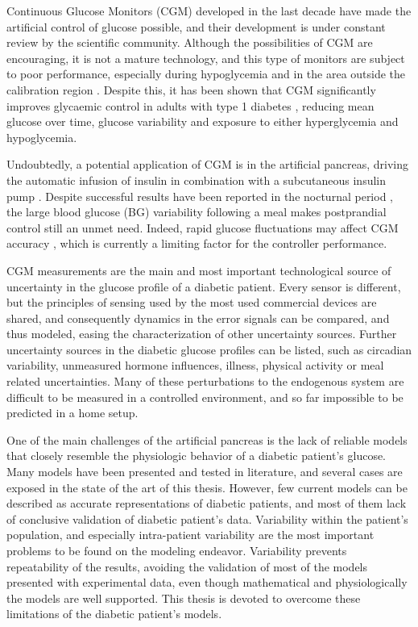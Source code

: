 Continuous Glucose Monitors (CGM) developed in the last decade have made the artificial control of glucose possible, and their development is under constant review by the scientific community. Although the possibilities of CGM are encouraging, it is not a mature technology, and this type of monitors are subject to poor performance, especially during hypoglycemia and in the area outside the calibration region \cite{mazze2009evaluating}. Despite this, it has been shown that CGM significantly improves glycaemic control in adults with type 1 diabetes \cite{bailey2007reduction} \cite{garg2007continuous}, reducing mean glucose over time, glucose variability and exposure to either hyperglycemia and hypoglycemia. %

Undoubtedly, a potential application of CGM is in the artificial pancreas, driving the automatic infusion of insulin in combination with a subcutaneous insulin pump \cite{hirsch2008clinical}. Despite successful results have been reported in the nocturnal period \cite{clarke2009closed,hovorka2010manual}, the large blood glucose (BG) variability following a meal makes postprandial control still an unmet need. Indeed, rapid glucose fluctuations may affect CGM accuracy \cite{rebrin1999subcutaneous}, which is currently a limiting factor for the controller performance. 

CGM measurements are the main and most important technological source of uncertainty in the glucose profile of a diabetic patient. Every sensor is different, but the principles of sensing used by the most used commercial devices are shared, and consequently dynamics in the error signals can be compared, and thus modeled, easing the characterization of other uncertainty sources. Further uncertainty sources in the diabetic glucose profiles can be listed, such as circadian variability, unmeasured hormone influences, illness, physical activity or meal related uncertainties. Many of these perturbations to the endogenous system are difficult to be measured in a controlled environment, and so far impossible to be predicted in a home setup.

One of the main challenges of the artificial pancreas is the lack of reliable models that closely resemble the physiologic behavior of a diabetic patient's glucose. Many models have been presented and tested in literature, and several cases are exposed in the state of the art of this thesis. However, few current models can be described as accurate representations of diabetic patients, and most of them lack of conclusive validation of diabetic patient's data. Variability within the patient's population, and especially intra-patient variability are the most important problems to be found on the modeling endeavor. Variability prevents repeatability of the results, avoiding the validation of most of the models presented with experimental data, even though mathematical and physiologically the models are well supported. This thesis is devoted to overcome these limitations of the diabetic patient's models.


